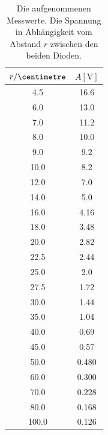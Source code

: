 \begin{table}
  \centering
  \caption{Die aufgenommenen Messwerte. Die Spannung in Abhängigkeit vom Abstand $r$ zwischen den beiden Dioden. } 
  \label{tab:data_dioden}
  \begin{tabular}{c c}
    \toprule
    $r / \si{\centimetre}$ & $A [\si{\volt}]$\\
    \midrule
    4.5    &   16.6  \\
  6.0    &   13.0  \\
  7.0    &   11.2  \\
  8.0    &   10.0  \\
  9.0    &   9.2   \\
  10.0   &   8.2   \\
  12.0   &   7.0   \\
  14.0   &   5.0   \\
  16.0   &   4.16  \\
  18.0   &   3.48  \\
  20.0   &   2.82  \\
  22.5   &   2.44  \\
  25.0   &   2.0   \\
  27.5   &   1.72  \\
  30.0   &   1.44  \\
  35.0   &   1.04  \\
  40.0   &   0.69  \\
  45.0   &   0.57  \\
  50.0   &   0.480  \\
  60.0   &   0.300  \\
  70.0   &   0.228  \\
  80.0   &   0.168  \\
  100.0  &   0.126  \\
    \bottomrule
  \end{tabular}
\end{table}
